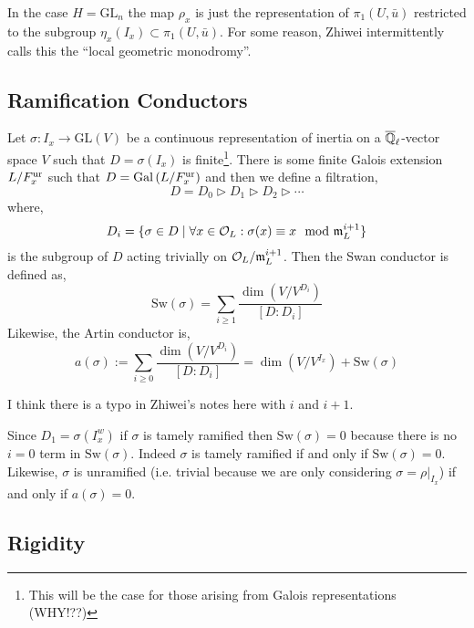\documentclass[12pt]{article}
\begin{document}
\begin{rmk}
In the case $H = \mathrm{GL}_n$ the map $\rho_x$ is just the representation of $\pi_1(U, \bar{u})$ restricted to the subgroup $\eta_x(I_x) \subset \pi_1(U, \bar{u})$. For some reason, Zhiwei intermittently calls this the ``local geometric monodromy''. 
\end{rmk}

\subsection{Ramification Conductors}

\newcommand{\Sw}{\mathrm{Sw}}

\begin{defn}
Let $\sigma : I_x \to \mathrm{GL}(V)$ be a continuous representation of inertia on a $\overline{\mathbb{Q}}_\ell$-vector space $V$ such that $D = \sigma(I_x)$ is finite\footnote{This will be the case for those arising from Galois representations (WHY!??)}. There is some finite Galois extension $L / F^{\mathrm{ur}}_x$ such that $D = \mathrm{Gal}\left( L/F^{\mathrm{ur}}_x \right)$ and then we define a filtration,
\[ D = D_0 \triangleright D_1 \triangleright D_2 \triangleright \cdots \]
where,
\[ D_i = \{ \sigma \in D \mid \forall x \in \mathcal{O}_{L} : \sigma(x) \equiv x \mod {\mathfrak{m}}_L^{i+1} \} \]
is the subgroup of $D$ acting trivially on $\mathcal{O}_{L} / \mathfrak{m}_L^{i+1}$. Then the Swan conductor is defined as,
\[ \Sw(\sigma) = \sum_{i \ge 1} \frac{\dim{(V / V^{D_i})}}{[D : D_i]} \]
Likewise, the Artin conductor is,
\[ a(\sigma) := \sum_{i \ge 0} \frac{\dim(V/V^{D_i})}{[D : D_i]} = \dim(V/V^{I_x}) + \Sw(\sigma) \]
\end{defn}

\begin{rmk}
I think there is a typo in Zhiwei's notes here with $i$ and $i+1$. 
\end{rmk}

\begin{rmk}
Since $D_1 = \sigma(I^w_x)$ if $\sigma$ is tamely ramified then $\Sw(\sigma) = 0$ because there is no $i = 0$ term in $\Sw(\sigma)$. Indeed $\sigma$ is tamely ramified if and only if $\Sw(\sigma) = 0$. Likewise, $\sigma$ is unramified (i.e. trivial because we are only considering $\sigma = \rho|_{I_x}$) if and only if $a(\sigma) = 0$. 
\end{rmk}


\subsection{Rigidity}
\end{document}
